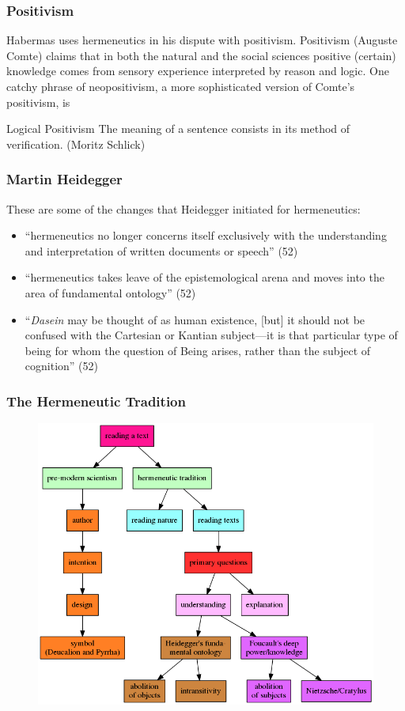 \documentclass[xcolor=dvipsnames]{beamer}
\begin{document}
\begin{frame}
  \frametitle{Positivism}
  Habermas uses hermeneutics in his dispute with \alert{positivism}.
  Positivism (Auguste Comte) claims that in both the natural and the
  social sciences positive (certain) knowledge comes from sensory
  experience interpreted by reason and logic. One catchy phrase of
  neopositivism, a more sophisticated version of Comte's positivism,
  is
  \begin{block}{Logical Positivism}
    The meaning of a sentence consists in its method of verification.
    (Moritz Schlick)
  \end{block}
\end{frame}

\begin{frame}
  \frametitle{Martin Heidegger}
  These are some of the changes that Heidegger initiated for
  hermeneutics:
  \begin{itemize}
  \item ``hermeneutics no longer concerns itself exclusively with the
    understanding and interpretation of written documents or speech''
    (52)
  \item ``hermeneutics takes leave of the epistemological arena and
    moves into the area of fundamental ontology'' (52)
  \item ``\emph{Dasein} may be thought of as human existence, [but] it
    should not be confused with the Cartesian or Kantian subject---it
    is that particular type of being for whom the question of Being
    arises, rather than the subject of cognition'' (52)
  \end{itemize}
\end{frame}

\begin{frame}
  \frametitle{The Hermeneutic Tradition}
\begin{figure}[h]
\includegraphics[scale=.32]{./subob.png}
\end{figure}
\end{frame}
\end{document}
